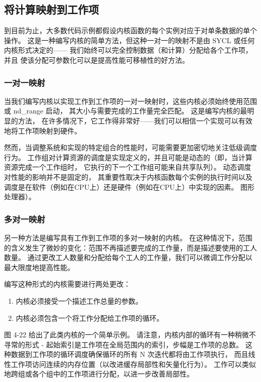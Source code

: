 \subsection{将计算映射到工作项}
到目前为止，大多数代码示例都假设内核函数的每个实例对应于对单条数据的单个操作。 
这是一种编写内核的简单方法，但这种一对一的映射不是由 SYCL 或任何内核形式决定的——
我们始终可以完全控制数据（和计算）分配给各个工作项，并且 使该分配可参数化可以是提高性能可移植性的好方法。

\subsubsection{一对一映射}
当我们编写内核以实现工作到工作项的一对一映射时，这些内核必须始终使用范围或 nd\_range 启动，
其大小与需要完成的工作量完全匹配。 这是编写内核的最明显的方法，
在许多情况下，它工作得非常好——我们可以相信一个实现可以有效地将工作项映射到硬件。

然而，当调整系统和实现的特定组合的性能时，可能需要更加密切地关注低级调度行为。 
工作组对计算资源的调度是实现定义的，并且可能是动态的（即，当计算资源完成一个工作组时，
它执行的下一个工作组可能来自共享队列）。 动态调度对性能的影响并不是固定的，
其重要性取决于内核函数每个实例的执行时间以及调度是在软件（例如在CPU上）还是硬件（例如在CPU上）中实现的因素。 
图形处理器）。

\subsubsection{多对一映射}
另一种方法是编写具有工作到工作项的多对一映射的内核。 
在这种情况下，范围的含义发生了微妙的变化：范围不再描述要完成的工作量，而是描述要使用的工人数量。 
通过更改工人数量和分配给每个工人的工作量，我们可以微调工作分配以最大限度地提高性能。

编写这种形式的内核需要进行两处更改：

\begin{enumerate}
	\item 内核必须接受一个描述工作总量的参数。

	\item 内核必须包含一个将工作分配给工作项的循环。
\end{enumerate}

图 4-22 给出了此类内核的一个简单示例。 请注意，内核内部的循环有一种稍微不寻常的形式 - 
起始索引是工作项在全局范围内的索引，步幅是工作项的总数。 
这种数据到工作项的循环调度确保循环的所有 N 次迭代都将由工作项执行，
而且线性工作项访问连续的内存位置（以改进缓存局部性和矢量化行为）。 
工作可以类似地跨组或各个组中的工作项进行分配，以进一步改善局部性。

